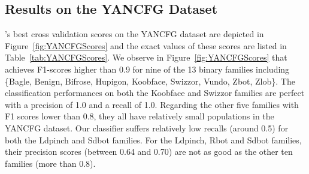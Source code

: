 

\subsection{Results on the YANCFG Dataset}
\sysname's best cross validation scores on the YANCFG dataset are depicted in Figure~\ref{fig:YANCFGScores} and the exact values of these scores are listed in Table~\ref{tab:YANCFGScores}.
We observe in Figure~\ref{fig:YANCFGScores} that \sysname achieves F1-scores higher than 0.9 for nine of the 13 binary families including \{Bagle, Benign, Bifrose, Hupigon, Koobface, Swizzor, Vundo, Zbot, Zlob\}.
The classification performances on both the Koobface and Swizzor families are perfect with a precision of 1.0 and a recall of 1.0.
Regarding the other five families with F1 scores lower than 0.8, they all have relatively small populations in the YANCFG dataset.
Our classifier suffers relatively low recalls (around 0.5) for both the Ldpinch and Sdbot families. For the Ldpinch, Rbot and Sdbot families, their precision scores (between 0.64 and 0.70) are not as good as the other ten families (more than 0.8).

